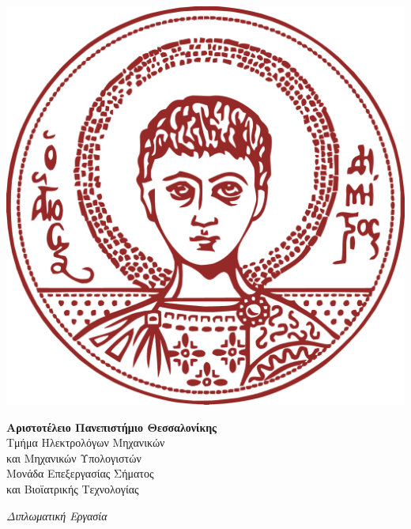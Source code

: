 \begin{titlepage}
	\begin{center}
		\vspace{1cm}
		
		\begin{minipage}{.25\linewidth}
			\begin{flushright}
				\includegraphics[width=\textwidth]{./images/title/auth_logo.png}
			\end{flushright}
		\end{minipage}
		\hfill
		\begin{minipage}{.7\linewidth}
			\begin{flushleft}
				\large
				\textbf{Αριστοτέλειο Πανεπιστήμιο Θεσσαλονίκης} \\[0.5cm]
				Τμήμα Ηλεκτρολόγων Μηχανικών \\ και Μηχανικών Υπολογιστών \\[0.2cm]
				
				\small{Μονάδα Επεξεργασίας Σήματος \\ και Βιοϊατρικής Τεχνολογίας}
			\end{flushleft} 
		\end{minipage}
		
		\vfill
		
		\Large{\textsl{Διπλωματική Εργασία}}
		

\end{center}
\end{titlepage}
